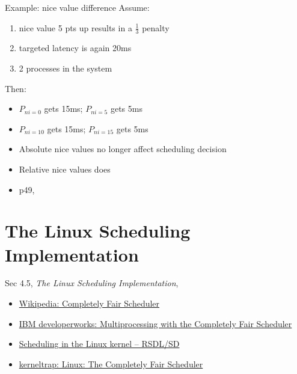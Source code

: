 \begin{frame}
  \begin{block}{Example: nice value difference}
    Assume:
    \begin{enumerate}
    \item nice value 5 pts up results in a $\frac{1}{3}$ penalty
    \item targeted latency is again 20ms
    \item 2 processes in the system
    \end{enumerate}
    Then:
    \begin{itemize}
    \item $P_{ni=0}$ gets 15ms; $P_{ni=5}$ gets 5ms
    \item $P_{ni=10}$ gets 15ms; $P_{ni=15}$ gets 5ms
    \end{itemize}
    \begin{itemize}
    \item Absolute nice values no longer affect scheduling decision
    \item Relative nice values does
    \end{itemize}
  \end{block}
\end{frame}

\begin{itemize}
\item p49, \cite{love2010linux}
\end{itemize}

\section{The Linux Scheduling Implementation}
\label{sec:linux-sched-impl}

Sec 4.5, \emph{The Linux Scheduling Implementation}, \cite{love2010linux}

\begin{itemize}
\item \href{https://en.wikipedia.org/wiki/Completely_Fair_Scheduler}{Wikipedia: Completely
  Fair Scheduler}
\item \href{http://www.ibm.com/developerworks/linux/library/l-cfs/}{IBM developerworks:
    Multiprocessing with the Completely Fair Scheduler}
\item
  \href{http://embeddeddev.wordpress.com/2011/11/23/scheduling-in-the-linux-kernel/}{Scheduling
    in the Linux kernel – RSDL/SD}
\item \href{http://kerneltrap.org/node/8059}{kerneltrap: Linux: The Completely Fair
    Scheduler}
\end{itemize}

